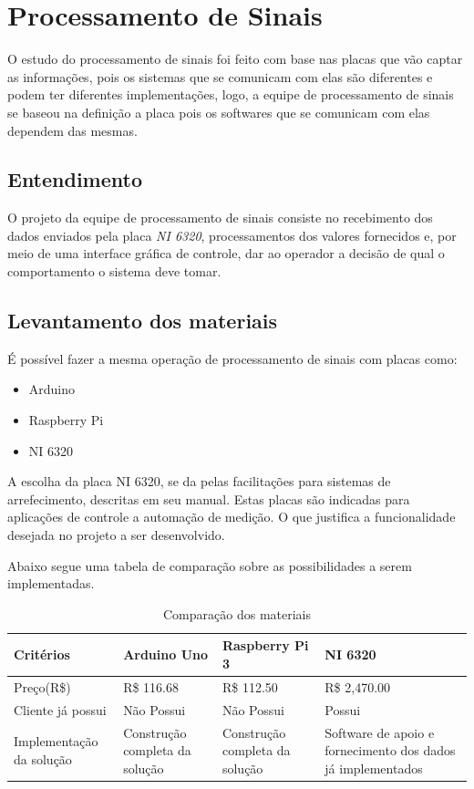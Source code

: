 \section{Processamento de Sinais}

O estudo do processamento de sinais foi feito com base nas placas que vão captar as informações, pois os sistemas que se comunicam com elas são diferentes e podem ter diferentes implementações, logo, a equipe de processamento de sinais se baseou na definição a placa
pois os softwares que se comunicam com elas dependem das mesmas.

\subsection{Entendimento}

O projeto da equipe de processamento de sinais consiste no recebimento dos dados enviados pela placa \textit{NI 6320}, processamentos dos valores fornecidos e, por meio de uma interface gráfica de controle, dar ao operador a decisão de qual o comportamento o sistema deve tomar.

\subsection{Levantamento dos materiais}

É possível fazer a mesma operação de processamento de sinais com placas como:
\begin{itemize}
    \item Arduino
    \item Raspberry Pi
    \item NI 6320
    
\end{itemize}

A escolha da placa NI 6320, se da pelas facilitações para sistemas de arrefecimento, descritas em seu manual. Estas placas são indicadas para aplicações de controle a automação de medição. O que justifica a funcionalidade desejada no projeto a ser desenvolvido.

Abaixo segue uma tabela de comparação sobre as possibilidades a serem implementadas.

    \begin{table}[htb]
        \centering
        \begin{tabular}{|p{3cm}|p{3cm}|p{3cm}|p{3cm}|}
        \hline
        Critérios & Arduino Uno & Raspberry Pi 3 & NI 6320 \\ \hline
        Preço(R\$) & R\$ 116.68 & R\$ 112.50 & R\$ 2,470.00 \\ \hline
        Cliente já possui & Não Possui & Não Possui & Possui \\ \hline
        Implementação da solução & Construção completa da solução & Construção completa da solução & Software de apoio e fornecimento dos dados já implementados\\ \hline
        \end{tabular}
        \caption{Comparação dos materiais}
        \end{table}

